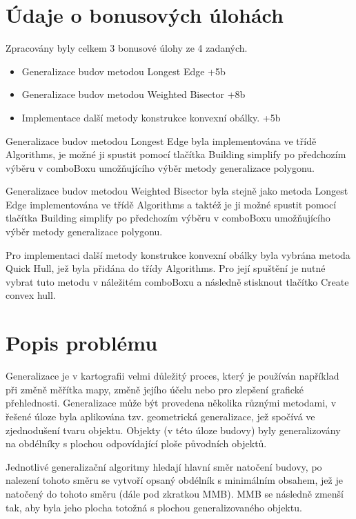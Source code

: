 \documentclass[11pt]{article}
\begin{document}
	\section{Údaje o bonusových úlohách}
	Zpracovány byly celkem 3 bonusové úlohy ze 4 zadaných.
	
	\begin{itemize}
		\item Generalizace budov metodou Longest Edge +5b
		\item Generalizace budov metodou Weighted Bisector +8b
		\item Implementace další metody konstrukce konvexní obálky. +5b
	\end{itemize}
	
	Generalizace budov metodou Longest Edge byla implementována ve třídě Algorithms, je možné ji spustit pomocí tlačítka Building simplify po předchozím výběru v comboBoxu umožňujícího výběr metody generalizace polygonu.
	
	Generalizace budov metodou Weighted Bisector byla stejně jako metoda Longest Edge implementována ve třídě Algorithms a taktéž je ji možné spustit pomocí tlačítka Building simplify po předchozím výběru v comboBoxu umožňujícího výběr metody generalizace polygonu.
	
	Pro implementaci další metody konstrukce konvexní obálky byla vybrána metoda Quick Hull, jež byla přidána do třídy Algorithms. Pro její spuštění je nutné vybrat tuto metodu v náležitém comboBoxu a následně stisknout tlačítko Create convex hull.
	
	
	
	\section{Popis problému}
	Generalizace je v kartografii velmi důležitý proces, který je používán například při změně měřítka mapy, změně jejího účelu nebo pro zlepšení grafické přehlednosti. Generalizace může být provedena několika různými metodami, v řešené úloze byla aplikována tzv. geometrická generalizace, jež spočívá ve zjednodušení tvaru objektu. Objekty (v této úloze budovy) byly generalizovány na obdélníky s plochou odpovídající ploše původních objektů.
	
	Jednotlivé generalizační algoritmy hledají hlavní směr natočení budovy, po nalezení tohoto směru se vytvoří opsaný obdélník s minimálním obsahem, jež je natočený do tohoto směru (dále pod zkratkou MMB). MMB se následně zmenší tak, aby byla jeho plocha totožná s plochou generalizovaného objektu. 
	
\end{document}
